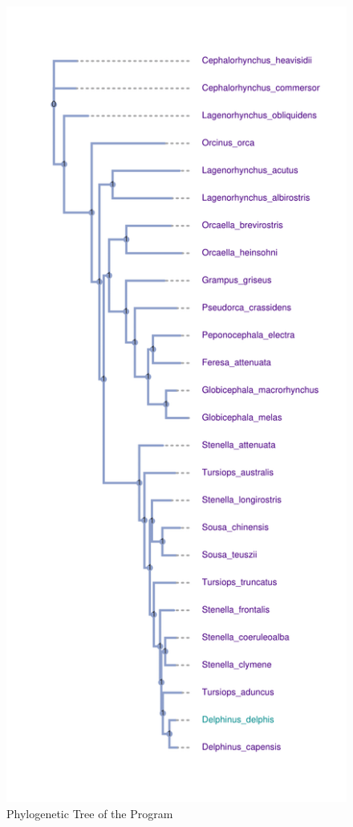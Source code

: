 \documentclass[12pt]{article}
\begin{document}
\begin{figure}
    \centering
    \includegraphics[scale = 0.9]{tree-plot_MB-1.png}
    \caption{Phylogenetic Tree of the Program}
    \label{fig:ourPhy}
\end{figure}
\end{document}

